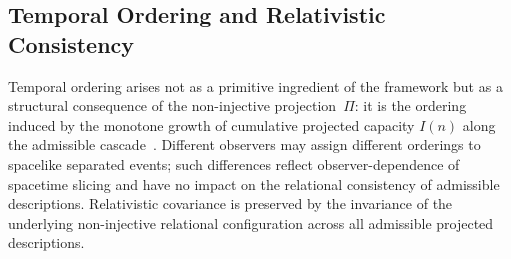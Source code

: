 \subsection{Temporal Ordering and Relativistic Consistency}
  \label{subsec:temporal-ordering-and-relativistic-consistency}

  Temporal ordering arises not as a primitive ingredient of the framework
  but as a structural consequence of the non-injective projection~$\Pi$:
  it is the ordering induced by the monotone growth of cumulative projected
  capacity $I(n)$ along the admissible cascade~\cite{Beau2026pto}.
  Different observers may assign different orderings to spacelike separated
  events; such differences reflect observer-dependence of spacetime slicing
  and have no impact on the relational consistency of admissible descriptions.
  Relativistic covariance is preserved by the invariance of the underlying
  non-injective relational configuration across all admissible projected descriptions.

